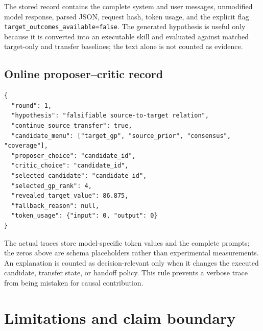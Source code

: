 \documentclass[pdflatex,sn-nature]{sn-jnl}
\newcommand{\code}[1]{\texttt{#1}}
\begin{document}
\begin{appendices}
The stored record contains the complete system and user messages, unmodified
model response, parsed JSON, request hash, token usage, and the explicit flag
\code{target\_outcomes\_available=false}. The generated hypothesis is useful
only because it is converted into an executable skill and evaluated against
matched target-only and transfer baselines; the text alone is not counted as
evidence.

\subsection{Online proposer--critic record}

\begin{lstlisting}[style=carecode]
{
  "round": 1,
  "hypothesis": "falsifiable source-to-target relation",
  "continue_source_transfer": true,
  "candidate_menu": ["target_gp", "source_prior", "consensus", "coverage"],
  "proposer_choice": "candidate_id",
  "critic_choice": "candidate_id",
  "selected_candidate": "candidate_id",
  "selected_gp_rank": 4,
  "revealed_target_value": 86.875,
  "fallback_reason": null,
  "token_usage": {"input": 0, "output": 0}
}
\end{lstlisting}

The actual traces store model-specific token values and the complete prompts;
the zeros above are schema placeholders rather than experimental measurements.
An explanation is counted as decision-relevant only when it changes the
executed candidate, transfer state, or handoff policy. This rule prevents a
verbose trace from being mistaken for causal contribution.

\section{Limitations and claim boundary}
\label{sec:limitations}


\end{appendices}
\end{document}

